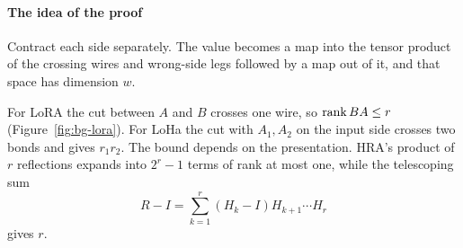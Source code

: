 \paragraph{The idea of the proof}
Contract each side separately. The value becomes a map into the tensor product of the crossing wires and wrong-side legs
followed by a map out of it, and that space has dimension $w$.

\medskip\noindent
For LoRA the cut between $A$ and $B$ crosses one wire, so $\operatorname{rank} BA\le r$ (Figure~\ref{fig:bg-lora}). For LoHa the cut
with $A_1,A_2$ on the input side crosses two bonds and gives $r_1r_2$. The bound depends on the presentation. HRA's
product of $r$ reflections expands into $2^r-1$ terms of rank at most one, while the telescoping sum
\begin{equation*}
  R-I=\sum_{k=1}^r(H_k-I)H_{k+1}\cdots H_r
\end{equation*}
gives $r$.

